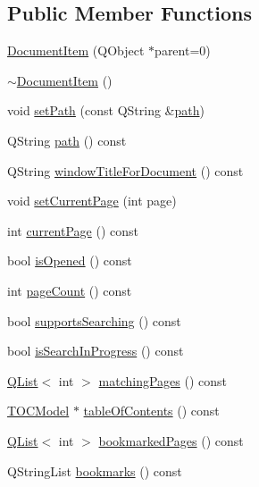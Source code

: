 \subsection*{Public Member Functions}
\begin{DoxyCompactItemize}
\item 
\hyperlink{classDocumentItem_a8a5f6a64304146f2bdb210fa4ce389cf}{Document\+Item} (Q\+Object $\ast$parent=0)
\item 
\hyperlink{classDocumentItem_a7877876d68ce57c1abd6d032f827d90b}{$\sim$\+Document\+Item} ()
\item 
void \hyperlink{classDocumentItem_a37f59ff77a3ddb1e5489193a7fc4bd76}{set\+Path} (const Q\+String \&\hyperlink{classDocumentItem_a30563830d010ecd2bcff1fe87d3f22b5}{path})
\item 
Q\+String \hyperlink{classDocumentItem_a85bb3a660c7282a9902af4aaff4dca36}{path} () const 
\item 
Q\+String \hyperlink{classDocumentItem_a1b188e9c812433f8041da69e26655c5a}{window\+Title\+For\+Document} () const 
\item 
void \hyperlink{classDocumentItem_a64dc8e35de8034dd26a5f3362712a425}{set\+Current\+Page} (int page)
\item 
int \hyperlink{classDocumentItem_ac61bb0c127edebd8f088aa65287b5772}{current\+Page} () const 
\item 
bool \hyperlink{classDocumentItem_a9d3f0f9e5707a61307fed8c07599b58f}{is\+Opened} () const 
\item 
int \hyperlink{classDocumentItem_afd4f5c196855621c5dabbe706dd8f1c0}{page\+Count} () const 
\item 
bool \hyperlink{classDocumentItem_aadcded16a6571167891465b6c54d10c7}{supports\+Searching} () const 
\item 
bool \hyperlink{classDocumentItem_afd279bb2b306dffa5ba37d1c530fc8d8}{is\+Search\+In\+Progress} () const 
\item 
\hyperlink{classQList}{Q\+List}$<$ int $>$ \hyperlink{classDocumentItem_aeb4a1f3c0a506387ca2f99fc918f3fd7}{matching\+Pages} () const 
\item 
\hyperlink{classTOCModel}{T\+O\+C\+Model} $\ast$ \hyperlink{classDocumentItem_a951ccd142ffc695850220a13dc70fa95}{table\+Of\+Contents} () const 
\item 
\hyperlink{classQList}{Q\+List}$<$ int $>$ \hyperlink{classDocumentItem_a1eb9015c51dea5321dad0af01e520948}{bookmarked\+Pages} () const 
\item 
Q\+String\+List \hyperlink{classDocumentItem_aca9ab9de0403c1363f6dafa84f475b12}{bookmarks} () const 

\end{DoxyCompactItemize}
